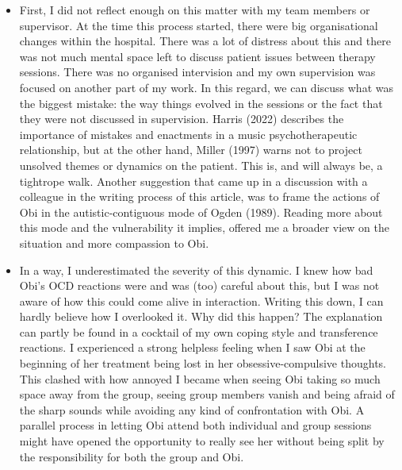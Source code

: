 \documentclass[authordate, empirical, issue]{jote-new-article}
\begin{document}
\begin{itemize}


  \item First, I did not reflect enough on this matter with my team members or supervisor. At the time this process started, there were big organisational changes within the hospital. There was a lot of distress about this and there was not much mental space left to discuss patient issues between therapy sessions. There was no organised intervision and my own supervision was focused on another part of my work. In this regard, we can discuss what was the biggest mistake: the way things evolved in the sessions or the fact that they were not discussed in supervision. Harris (2022) describes the importance of mistakes and enactments in a music psychotherapeutic relationship, but at the other hand, Miller (1997) warns not to project unsolved themes or dynamics on the patient. This is, and will always be, a tightrope walk. Another suggestion that came up in a discussion with a colleague in the writing process of this article, was to frame the actions of Obi in the autistic-contiguous mode of Ogden (1989). Reading more about this mode and the vulnerability it implies, offered me a broader view on the situation and more compassion to Obi.



  \item
        In a way, I underestimated the severity of this dynamic. I knew how bad Obi's OCD reactions were and was (too) careful about this, but I was not aware of how this could come alive in interaction. Writing this down, I can hardly believe how I overlooked it. Why did this happen? The explanation can partly be found in a cocktail of my own coping style and transference reactions. I experienced a strong helpless feeling when I saw Obi at the beginning of her treatment being lost in her obsessive-compulsive thoughts. This clashed with how annoyed I became when seeing Obi taking so much space away from the group, seeing group members vanish and being afraid of the sharp sounds while avoiding any kind of confrontation with Obi. A parallel process in letting Obi attend both individual and group sessions might have opened the opportunity to really see her without being split by the responsibility for both the group and Obi.




\end{itemize}
\end{document}
